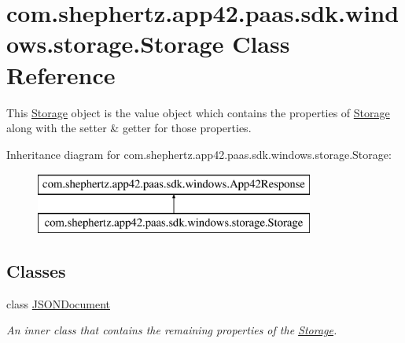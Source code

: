\hypertarget{classcom_1_1shephertz_1_1app42_1_1paas_1_1sdk_1_1windows_1_1storage_1_1_storage}{\section{com.\+shephertz.\+app42.\+paas.\+sdk.\+windows.\+storage.\+Storage Class Reference}
\label{classcom_1_1shephertz_1_1app42_1_1paas_1_1sdk_1_1windows_1_1storage_1_1_storage}
}


This \hyperlink{classcom_1_1shephertz_1_1app42_1_1paas_1_1sdk_1_1windows_1_1storage_1_1_storage}{Storage} object is the value object which contains the properties of \hyperlink{classcom_1_1shephertz_1_1app42_1_1paas_1_1sdk_1_1windows_1_1storage_1_1_storage}{Storage} along with the setter \& getter for those properties.  


Inheritance diagram for com.\+shephertz.\+app42.\+paas.\+sdk.\+windows.\+storage.\+Storage\+:\begin{figure}[H]
\begin{center}
\leavevmode
\includegraphics[height=2.000000cm]{classcom_1_1shephertz_1_1app42_1_1paas_1_1sdk_1_1windows_1_1storage_1_1_storage}
\end{center}
\end{figure}
\subsection*{Classes}
\begin{DoxyCompactItemize}
\item 
class \hyperlink{classcom_1_1shephertz_1_1app42_1_1paas_1_1sdk_1_1windows_1_1storage_1_1_storage_1_1_j_s_o_n_document}{J\+S\+O\+N\+Document}
\begin{DoxyCompactList}\small\item\em An inner class that contains the remaining properties of the \hyperlink{classcom_1_1shephertz_1_1app42_1_1paas_1_1sdk_1_1windows_1_1storage_1_1_storage}{Storage}. \end{DoxyCompactList}\end{DoxyCompactItemize}
